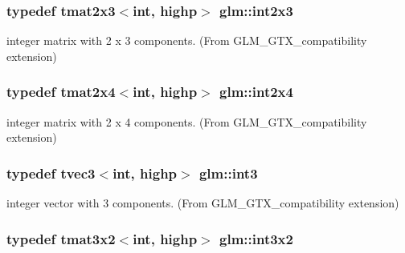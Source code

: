 \subsubsection[{int2x3}]{\setlength{\rightskip}{0pt plus 5cm}typedef tmat2x3$<$int, highp$>$ {\bf glm\+::int2x3}}\label{group__gtx__compatibility_ga37b2b18255fa5ff7fa23d8b1d34b8034}


integer matrix with 2 x 3 components. (From G\+L\+M\+\_\+\+G\+T\+X\+\_\+compatibility extension) 

\hypertarget{group__gtx__compatibility_gaa402ce479f756c0805d25fede99251e3}{}
\subsubsection[{int2x4}]{\setlength{\rightskip}{0pt plus 5cm}typedef tmat2x4$<$int, highp$>$ {\bf glm\+::int2x4}}\label{group__gtx__compatibility_gaa402ce479f756c0805d25fede99251e3}


integer matrix with 2 x 4 components. (From G\+L\+M\+\_\+\+G\+T\+X\+\_\+compatibility extension) 

\hypertarget{group__gtx__compatibility_gafc297ec294f5aa0360a634656c20e1d0}{}
\subsubsection[{int3}]{\setlength{\rightskip}{0pt plus 5cm}typedef tvec3$<$int, highp$>$ {\bf glm\+::int3}}\label{group__gtx__compatibility_gafc297ec294f5aa0360a634656c20e1d0}


integer vector with 3 components. (From G\+L\+M\+\_\+\+G\+T\+X\+\_\+compatibility extension) 

\hypertarget{group__gtx__compatibility_gac99c78a227d95384611146a64c4d3ce8}{}
\subsubsection[{int3x2}]{\setlength{\rightskip}{0pt plus 5cm}typedef tmat3x2$<$int, highp$>$ {\bf glm\+::int3x2}}\label{group__gtx__compatibility_gac99c78a227d95384611146a64c4d3ce8}


